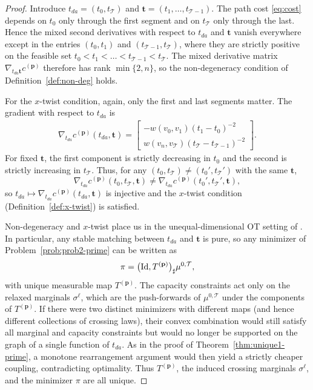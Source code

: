 \documentclass[11pt]{article}
\newcommand{\calT}{{\mathcal T}}
\begin{document}
\begin{proof}
Introduce $t_{da}=(t_0,t_\calT)$ and $\mathbf t=(t_1,\dots,t_{\calT-1})$. The path cost \eqref{eq:cost} depends on $t_0$ only through the first segment and on $t_\calT$ only through the last. Hence the mixed second derivatives with respect to $t_{da}$ and $\mathbf t$ vanish everywhere except in the entries $(t_0,t_1)$ and $(t_{\calT-1},t_\calT)$, where they are strictly positive on the feasible set $t_0 < t_1 < \dots < t_{\calT-1} < t_\calT$. The mixed derivative matrix $\nabla_{t_{da}\mathbf t}c^{(\mathbf p)}$ therefore has rank $\min\{2,n\}$, so the non-degeneracy condition of Definition~\ref{def:non-deg} holds.

For the $x$-twist condition, again, only the first and last segments matter. The gradient with respect to $t_{da}$ is
\begin{align*}
\nabla_{t_{da}} c^{(\mathbf p)}(t_{da},\mathbf t)
=
\begin{bmatrix}
-w(v_0,v_1)(t_1-t_0)^{-2}\\[0.08in]
w(v_n,v_\calT)(t_\calT-t_{\calT-1})^{-2}
\end{bmatrix}.
\end{align*}
For fixed $\mathbf t$, the first component is strictly decreasing in $t_0$ and the second is strictly increasing in $t_\calT$. Thus, for any $(t_0,t_\calT)\neq(t_0',t_\calT')$ with the same $\mathbf t$,
\[
\nabla_{t_{da}} c^{(\mathbf p)}(t_0,t_\calT,\mathbf t)
\neq
\nabla_{t_{da}} c^{(\mathbf p)}(t_0',t_\calT',\mathbf t),
\]
so $t_{da}\mapsto \nabla_{t_{da}} c^{(\mathbf p)}(t_{da},\mathbf t)$ is injective and the $x$-twist condition (Definition~\ref{def:x-twist}) is satisfied.

Non-degeneracy and $x$-twist place us in the unequal-dimensional OT setting of
\cite{chiappori2016multidimensional,chiappori2017multi,chiappori2020multidimensional}. In particular, any stable matching between $t_{da}$ and $\mathbf t$ is pure, so any minimizer of Problem~\ref{prob:prob2-prime} can be written as
\[
\pi = \big({\rm Id},T^{(\mathbf p)}\big)_{\sharp}\mu^{0,\calT},
\]
with unique measurable map $T^{(\mathbf p)}$. The capacity constraints act only on the relaxed marginals $\displaystyle \sigma^\ell$, which are the push-forwards of $\mu^{0,\calT}$ under the components of $T^{(\mathbf p)}$. If there were two distinct minimizers with different maps (and hence different collections of crossing laws), their convex combination would still satisfy all marginal and capacity constraints but would no longer be supported on the graph of a single function of $t_{da}$. As in the proof of Theorem~\ref{thm:unique1-prime}, a monotone rearrangement argument would then yield a strictly cheaper coupling, contradicting optimality. Thus $T^{(\mathbf p)}$, the induced crossing marginals $\sigma^\ell$, and the minimizer $\pi$ are all unique.
\end{proof}
\end{document}
